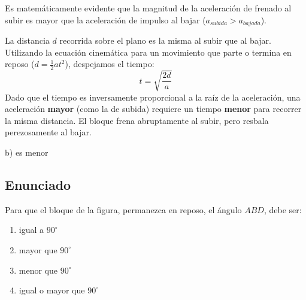 \documentclass[12pt, a4paper]{article}
\begin{document}
Es matemáticamente evidente que la magnitud de la aceleración de frenado al subir es mayor que la aceleración de impulso al bajar ($a_{subida} > a_{bajada}$).

La distancia $d$ recorrida sobre el plano es la misma al subir que al bajar.
Utilizando la ecuación cinemática para un movimiento que parte o termina en reposo ($d = \frac{1}{2} a t^2$), despejamos el tiempo:
$$ t = \sqrt{\frac{2d}{a}} $$
Dado que el tiempo es inversamente proporcional a la raíz de la aceleración, una aceleración \textbf{mayor} (como la de subida) requiere un tiempo \textbf{menor} para recorrer la misma distancia. El bloque frena abruptamente al subir, pero resbala perezosamente al bajar.

\begin{tcolorbox}[colback=green!5!white, colframe=green!50!black, title=Respuesta Final]
\centering \Large b) es menor
\end{tcolorbox}

\newpage

\subsection*{Enunciado}
Para que el bloque de la figura, permanezca en reposo, el ángulo $ABD$, debe ser:

\begin{center}
\end{center}

\begin{enumerate}[label=\alph*)]
    \item igual a $90^\circ$
    \item mayor que $90^\circ$
    \item menor que $90^\circ$
    \item igual o mayor que $90^\circ$
\end{enumerate}
\end{document}

